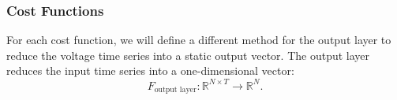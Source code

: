\subsubsection*{Cost Functions}

For each cost function, we will define a different method for the output layer to reduce the voltage time series into a static output vector. The output layer reduces the input time series into a one-dimensional vector:
\[ F_{\text{output layer}} : \mathbb{R}^{N \times T} \rightarrow \mathbb{R}^N. \]



